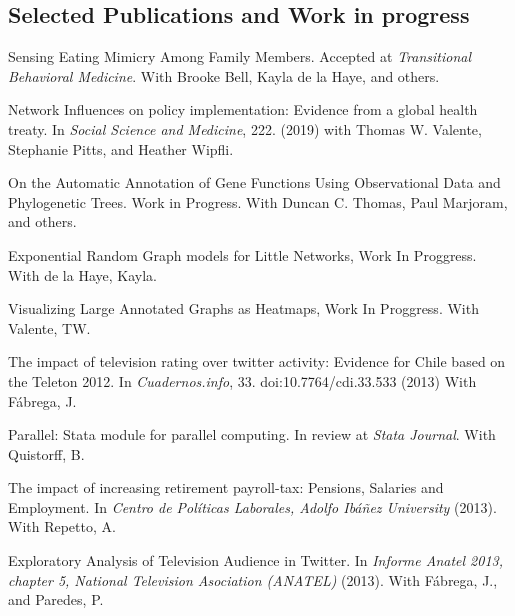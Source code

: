\documentclass[letterpaper, 11pt]{article}
\renewenvironment{itemize}{
  \begin{list}{}{
    \setlength{\leftmargin}{0.45cm}
  }
}{
  \end{list}
}
\begin{document}
\subsection*{Selected Publications and Work in progress}
\begin{itemize}

\item Sensing Eating Mimicry Among Family Members. Accepted at {\it Transitional Behavioral Medicine}. With Brooke Bell, Kayla de la Haye, and others.
\item Network Influences on policy implementation: Evidence from a global health treaty. In {\it Social Science and Medicine}, 222. (2019) with Thomas W. Valente, Stephanie Pitts, and Heather Wipfli. 
\item On the Automatic Annotation of Gene Functions Using Observational Data and Phylogenetic Trees. Work in Progress. With Duncan C. Thomas, Paul Marjoram, and others.
\item Exponential Random Graph models for Little Networks, Work In Proggress. With de la Haye, Kayla.
\item Visualizing Large Annotated Graphs as Heatmaps, Work In Proggress. With Valente, TW.
\item The impact of television rating over twitter activity: Evidence for Chile based on the Teleton 2012. In {\it Cuadernos.info}, 33. doi:10.7764/cdi.33.533 (2013) With F\'abrega, J.
\item Parallel: Stata module for parallel computing. In review at {\it Stata Journal}. With Quistorff, B.
\item The impact of increasing retirement payroll-tax: Pensions, Salaries and Employment. In {\it Centro de Pol\'iticas Laborales, Adolfo Ib\'a\~nez University} (2013). With Repetto, A.
\item Exploratory Analysis of Television Audience in Twitter. In {\it Informe Anatel 2013, chapter 5, National Television Asociation (ANATEL)} (2013). With F\'abrega, J., and Paredes, P.
\end{itemize}
\end{document}
